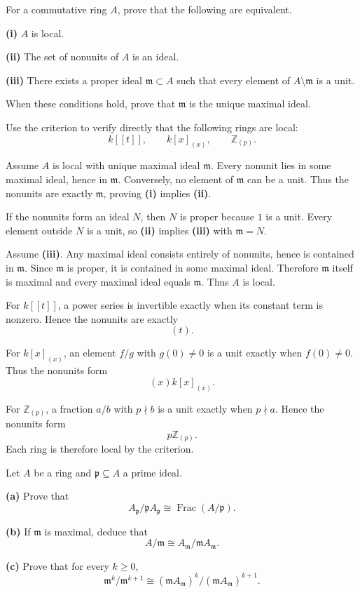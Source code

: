 \begin{problem}[CP-V-0017]
\label{prob:cp-v-0017}
For a commutative ring \(A\), prove that the following are equivalent.

\textbf{(i)} \(A\) is local.

\textbf{(ii)} The set of nonunits of \(A\) is an ideal.

\textbf{(iii)} There exists a proper ideal \(\mathfrak m\subset A\) such that
every element of \(A\setminus\mathfrak m\) is a unit.

When these conditions hold, prove that \(\mathfrak m\) is the unique maximal
ideal.

Use the criterion to verify directly that the following rings are local:
\[
k[[t]],\qquad k[x]_{(x)},\qquad \mathbb Z_{(p)}.
\]
\end{problem}

\begin{solution}
Assume \(A\) is local with unique maximal ideal \(\mathfrak m\). Every
nonunit lies in some maximal ideal, hence in \(\mathfrak m\). Conversely, no
element of \(\mathfrak m\) can be a unit. Thus the nonunits are exactly
\(\mathfrak m\), proving \textbf{(i)} implies \textbf{(ii)}.

If the nonunits form an ideal \(N\), then \(N\) is proper because \(1\) is a
unit. Every element outside \(N\) is a unit, so \textbf{(ii)} implies
\textbf{(iii)} with \(\mathfrak m=N\).

Assume \textbf{(iii)}. Any maximal ideal consists entirely of nonunits, hence
is contained in \(\mathfrak m\). Since \(\mathfrak m\) is proper, it is
contained in some maximal ideal. Therefore \(\mathfrak m\) itself is maximal
and every maximal ideal equals \(\mathfrak m\). Thus \(A\) is local.

For \(k[[t]]\), a power series is invertible exactly when its constant term is
nonzero. Hence the nonunits are exactly
\[
(t).
\]

For \(k[x]_{(x)}\), an element \(f/g\) with \(g(0)\ne0\) is a unit exactly
when \(f(0)\ne0\). Thus the nonunits form
\[
(x)k[x]_{(x)}.
\]

For \(\mathbb Z_{(p)}\), a fraction \(a/b\) with \(p\nmid b\) is a unit
exactly when \(p\nmid a\). Hence the nonunits form
\[
p\mathbb Z_{(p)}.
\]
Each ring is therefore local by the criterion.
\end{solution}


\begin{problem}[CP-V-0052]
\label{prob:cp-v-0052}
Let \(A\) be a ring and \(\mathfrak p\subseteq A\) a prime ideal.

\textbf{(a)} Prove that
\[
A_{\mathfrak p}/\mathfrak pA_{\mathfrak p}
\cong
\operatorname{Frac}(A/\mathfrak p).
\]

\textbf{(b)} If \(\mathfrak m\) is maximal, deduce that
\[
A/\mathfrak m
\cong
A_{\mathfrak m}/\mathfrak mA_{\mathfrak m}.
\]

\textbf{(c)} Prove that for every \(k\ge0\),
\[
\mathfrak m^k/\mathfrak m^{k+1}
\cong
(\mathfrak mA_{\mathfrak m})^k/
(\mathfrak mA_{\mathfrak m})^{k+1}.
\]
\end{problem}

